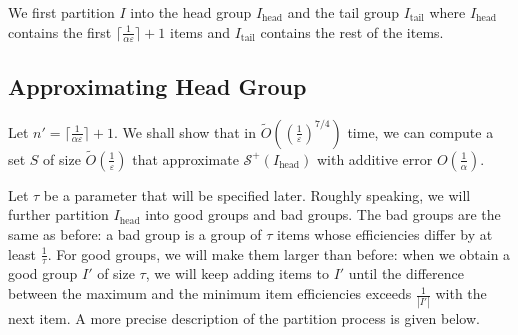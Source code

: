 \documentclass[a4paper,UKenglish,cleveref, autoref, thm-restate, pdfa]{lipics-v2021}
\newcommand{\eps}{\varepsilon}
\begin{document}
We first partition $I$ into the head group $I_{\mathrm{head}}$ and the tail group $I_{\mathrm{tail}}$ where $I_{\mathrm{head}}$ contains the first $\lceil \frac{1}{\alpha\eps}\rceil + 1 $ items and $I_{\mathrm{tail}}$ contains the rest of the items.

\subsection{Approximating Head Group}\label{sec:strong-head}
Let $n' = \lceil \frac{1}{\alpha\eps}\rceil + 1$.  We shall show that in $\tilde{O}((\frac{1}{\eps})^{7/4})$ time, we can compute a set $S$ of size $\tilde{O}(\frac{1}{\eps})$ that approximate $\mathcal{S}^+(I_{\mathrm{head}})$ with additive error $O(\frac{1}{\alpha})$.

Let $\tau$ be a parameter that will be specified later. Roughly speaking, we will further partition $I_{\mathrm{head}}$ into good groups and bad groups. The bad groups are the same as before: a bad group is a group of $\tau$ items whose efficiencies differ by at least $\frac{1}{\tau}$. For good groups, we will make them larger than before: when we obtain a good group $I'$ of size $\tau$, we will keep adding items to $I'$ until the difference between the maximum and the minimum item efficiencies exceeds $\frac{1}{|I'|}$ with the next item. A more precise description of the partition process is given below. 
\end{document}
